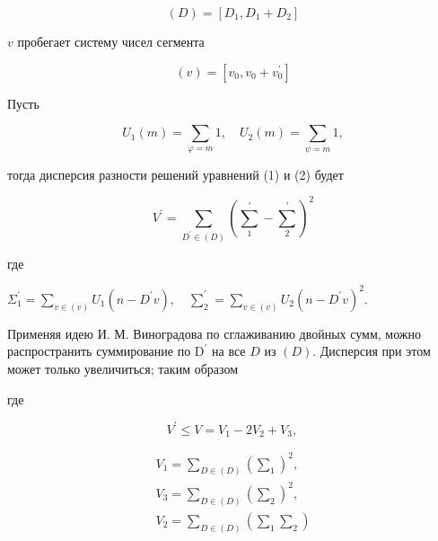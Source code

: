 \documentclass[10pt]{article}
\begin{document}
\[

(D)=\left[D_{1}, D_{1}+D_{2}\right]

\]



$v$ пробегает систему чисел сегмента



\[

(v)=\left[v_{0}, v_{0}+v_{0}^{\prime}\right]

\]



Пусть



\[

U_{1}(m)=\sum_{\varphi=m} 1, \quad U_{2}(m)=\sum_{\psi=m} 1,

\]



тогда дисперсия разности решений уравнений (1) и (2) будет



\[

V^{\prime}=\sum_{D^{\prime} \in(D)}\left(\sum_{1}^{\prime}-\sum_{2}^{\prime}\right)^{2}

\]



где



$\Sigma_{1}^{\prime}=\sum_{v \in(v)} U_{1}\left(n-D^{\prime} v\right), \quad \sum_{2}^{\prime}=\sum_{v \in(v)} U_{2}\left(n-D^{\prime} v\right)^{2}$.



Применяя идею И. М. Виноградова по сглаживанию двойных сумм, можно распространить суммирование по $\mathrm{D}^{\prime}$ на все $D$ из $(D)$. Дисперсия при этом может только увеличиться; таким образом



где



\[

V^{\prime} \leqslant V=V_{1}-2 V_{2}+V_{3} \text {, }

\]



\[

\begin{gathered}

V_{1}=\sum_{D \in(D)}\left(\sum_{1}\right)^{2}, \\

V_{3}=\sum_{D \in(D)}\left(\sum_{2}\right)^{2}, \\

V_{2}=\sum_{D \in(D)}\left(\sum_{1} \sum_{2}\right)

\end{gathered}

\]
\end{document}
